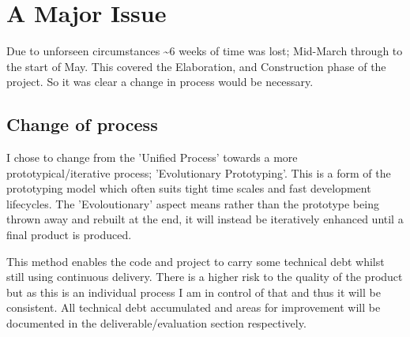 \section{A Major Issue}
Due to unforseen circumstances \textasciitilde6 weeks of time was lost;
Mid-March through to the start of May. This covered the Elaboration, and
Construction phase of the project. So it was clear a change in process would be
necessary.

\subsection{Change of process}
I chose to change from the 'Unified Process' towards a more
prototypical/iterative process; 'Evolutionary Prototyping'. This is a form of
the prototyping model which often suits tight time scales and fast development
lifecycles. The 'Evoloutionary' aspect means rather than the prototype being
thrown away and rebuilt at the end, it will instead be iteratively enhanced
until a final product is produced.

This method enables the code and project to carry some technical debt whilst
still using continuous delivery. There is a higher
risk to the quality of the product but as this is an individual process I am in
control of that and thus it will be consistent. All technical debt
accumulated and areas for improvement will be documented in the
deliverable/evaluation section respectively.
